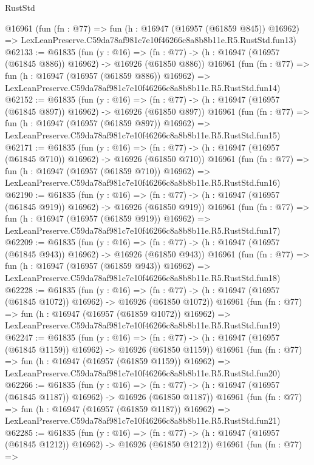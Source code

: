 \begin{lexlean}{RustStd}
\begin{coremodule}
    @16961
    (fun (fn : @77) =>
    fun (h : @16947 (@16957 (@61859 @845)) @16962) =>
    LexLeanPreserve.C59da78af981c7e10f46266c8a8b8b11e.R5.RustStd.fun13)
@62133 := @61835
    (fun (y : @16) =>
    (fn : @77) -> (h : @16947 (@16957 (@61845 @886)) @16962) -> @16926 (@61850 @886))
    @16961
    (fun (fn : @77) =>
    fun (h : @16947 (@16957 (@61859 @886)) @16962) =>
    LexLeanPreserve.C59da78af981c7e10f46266c8a8b8b11e.R5.RustStd.fun14)
@62152 := @61835
    (fun (y : @16) =>
    (fn : @77) -> (h : @16947 (@16957 (@61845 @897)) @16962) -> @16926 (@61850 @897))
    @16961
    (fun (fn : @77) =>
    fun (h : @16947 (@16957 (@61859 @897)) @16962) =>
    LexLeanPreserve.C59da78af981c7e10f46266c8a8b8b11e.R5.RustStd.fun15)
@62171 := @61835
    (fun (y : @16) =>
    (fn : @77) -> (h : @16947 (@16957 (@61845 @710)) @16962) -> @16926 (@61850 @710))
    @16961
    (fun (fn : @77) =>
    fun (h : @16947 (@16957 (@61859 @710)) @16962) =>
    LexLeanPreserve.C59da78af981c7e10f46266c8a8b8b11e.R5.RustStd.fun16)
@62190 := @61835
    (fun (y : @16) =>
    (fn : @77) -> (h : @16947 (@16957 (@61845 @919)) @16962) -> @16926 (@61850 @919))
    @16961
    (fun (fn : @77) =>
    fun (h : @16947 (@16957 (@61859 @919)) @16962) =>
    LexLeanPreserve.C59da78af981c7e10f46266c8a8b8b11e.R5.RustStd.fun17)
@62209 := @61835
    (fun (y : @16) =>
    (fn : @77) -> (h : @16947 (@16957 (@61845 @943)) @16962) -> @16926 (@61850 @943))
    @16961
    (fun (fn : @77) =>
    fun (h : @16947 (@16957 (@61859 @943)) @16962) =>
    LexLeanPreserve.C59da78af981c7e10f46266c8a8b8b11e.R5.RustStd.fun18)
@62228 := @61835
    (fun (y : @16) =>
    (fn : @77) -> (h : @16947 (@16957 (@61845 @1072)) @16962) -> @16926 (@61850 @1072))
    @16961
    (fun (fn : @77) =>
    fun (h : @16947 (@16957 (@61859 @1072)) @16962) =>
    LexLeanPreserve.C59da78af981c7e10f46266c8a8b8b11e.R5.RustStd.fun19)
@62247 := @61835
    (fun (y : @16) =>
    (fn : @77) -> (h : @16947 (@16957 (@61845 @1159)) @16962) -> @16926 (@61850 @1159))
    @16961
    (fun (fn : @77) =>
    fun (h : @16947 (@16957 (@61859 @1159)) @16962) =>
    LexLeanPreserve.C59da78af981c7e10f46266c8a8b8b11e.R5.RustStd.fun20)
@62266 := @61835
    (fun (y : @16) =>
    (fn : @77) -> (h : @16947 (@16957 (@61845 @1187)) @16962) -> @16926 (@61850 @1187))
    @16961
    (fun (fn : @77) =>
    fun (h : @16947 (@16957 (@61859 @1187)) @16962) =>
    LexLeanPreserve.C59da78af981c7e10f46266c8a8b8b11e.R5.RustStd.fun21)
@62285 := @61835
    (fun (y : @16) =>
    (fn : @77) -> (h : @16947 (@16957 (@61845 @1212)) @16962) -> @16926 (@61850 @1212))
    @16961
    (fun (fn : @77) =>

\end{coremodule}
\end{lexlean}
